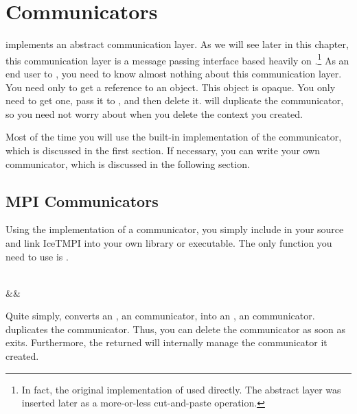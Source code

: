 

\chapter{Communicators}
\label{chap:Communicators}

\IceT implements an abstract communication layer.  As we will see later in
this chapter, this communication layer is a message passing interface based
heavily on \MPI.\footnote{In fact, the original implementation of \IceT
  used \MPI directly.  The abstract layer was inserted later as a
  more-or-less cut-and-paste operation.}  As an end user to \IceT, you need
to know almost nothing about this communication layer.  You need only to
get a reference to an  object.  This object is
opaque.  You only need to get one, pass it to
, and then delete it.
 will duplicate the communicator, so you need not
worry about when you delete the context you created.

Most of the time you will use the built-in \MPI implementation of the
communicator, which is discussed in the first section.  If necessary, you
can write your own communicator, which is discussed in the following section.

\section{MPI Communicators}
\label{sec:Communicators:MPI_Communicators}

Using the \MPI implementation of a communicator, you simply include
 in your source and link
IceTMPI into your own library or executable.  The
only function you need to use is .

\begin{Table}{3}
  \\
  \makebox[3.5in]{}&&\quad\textC{);}
\end{Table}

Quite simply,  converts an
, an \MPI communicator, into an ,
an \IceT communicator.   duplicates the
\MPI communicator.  Thus, you can delete the  communicator
as soon as  exits.  Furthermore, the
returned  will internally manage the \MPI
communicator it created.

